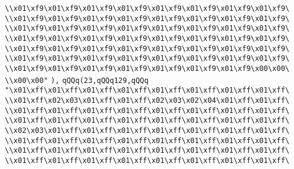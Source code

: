 \verb|\\x01\xf9\x01\xf9\x01\xf9\x01\xf9\x01\xf9\x01\xf9\x01\xf9\x01\xf9\|\newline
\verb|\\x01\xf9\x01\xf9\x01\xf9\x01\xf9\x01\xf9\x01\xf9\x01\xf9\x01\xf9\|\newline
\verb|\\x01\xf9\x01\xf9\x01\xf9\x01\xf9\x01\xf9\x01\xf9\x01\xf9\x01\xf9\|\newline
\verb|\\x01\xf9\x01\xf9\x01\xf9\x01\xf9\x01\xf9\x01\xf9\x01\xf9\x01\xf9\|\newline
\verb|\\x01\xf9\x01\xf9\x01\xf9\x01\xf9\x01\xf9\x01\xf9\x01\xf9\x01\xf9\|\newline
\verb|\\x01\xf9\x01\xf9\x01\xf9\x01\xf9\x01\xf9\x01\xf9\x01\xf9\x01\xf9\|\newline
\verb|\\x01\xf9\x01\xf9\x01\xf9\x01\xf9\x01\xf9\x01\xf9\x01\xf9\x00\x00\|\newline
\verb|\\x00\x00"|\newline
\verb|),|\newline
\verb|qQQq(23,qQQq129,qQQq|\newline
\verb|"\x01\xff\x01\xff\x01\xff\x01\xff\x01\xff\x01\xff\x01\xff\x01\xff\|\newline
\verb|\\x01\xff\x02\x03\x01\xff\x01\xff\x02\x03\x02\x04\x01\xff\x01\xff\|\newline
\verb|\\x01\xff\x01\xff\x01\xff\x01\xff\x01\xff\x01\xff\x01\xff\x01\xff\|\newline
\verb|\\x01\xff\x01\xff\x01\xff\x01\xff\x01\xff\x01\xff\x01\xff\x01\xff\|\newline
\verb|\\x02\x03\x01\xff\x01\xff\x01\xff\x01\xff\x01\xff\x01\xff\x01\xff\|\newline
\verb|\\x01\xff\x01\xff\x01\xff\x01\xff\x01\xff\x01\xff\x01\xff\x01\xff\|\newline
\verb|\\x01\xff\x01\xff\x01\xff\x01\xff\x01\xff\x01\xff\x01\xff\x01\xff\|\newline
\verb|\\x01\xff\x01\xff\x01\xff\x01\xff\x01\xff\x01\xff\x01\xff\x01\xff\|\newline
